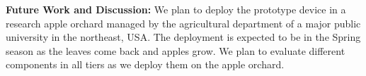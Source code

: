\noindent
\textbf{Future Work and Discussion:} We plan to deploy the prototype device in a research apple orchard managed by the agricultural department of a major public university in the northeast, USA. The deployment is expected to be in the Spring season as the leaves come back and apples grow. We plan to evaluate different components in all tiers as we deploy them on the apple orchard. 





